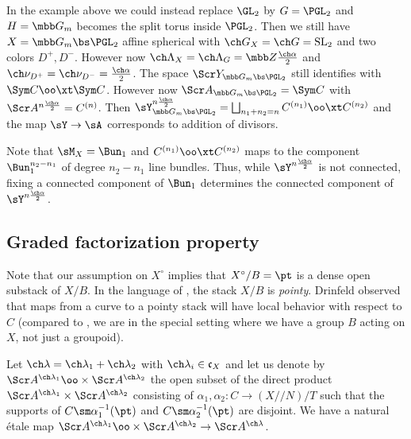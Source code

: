 \begin{eg}
\notready \label{eg:YHeckePGL}
In the example above we could instead replace $\GL_2$ by $G = \PGL_2$ and
$H = \mbb G_m$ becomes the split torus inside $\PGL_2$.
Then we still have $X = \mbb G_m\bs \PGL_2$ affine spherical with $\ch G_X = \ch G = \mathrm{SL}_2$ and two colors $D^+,D^-$.
However now $\ch\Lambda_X = \ch\Lambda_G = \mbb Z \frac {\ch\alpha}2$
and $\ch\nu_{D^+} = \ch\nu_{D^-} = \frac {\ch\alpha}2$.
The space $\Scr Y_{\mbb G_m \bs \PGL_2}$ still identifies with
$\Sym C \oo\xt \Sym C$. However now $\Scr A_{\mbb G_m \bs \PGL_2} = \Sym C$
with $\Scr A^{n \frac{\ch\alpha}2} = C^{(n)}$.
Then $\sY_{\mbb G_m \bs \PGL_2}^{n \frac{\ch\alpha}2} = \bigsqcup_{n_1+n_2=n} C^{(n_1)}\oo\xt C^{(n_2)}$ and the map $\sY \to \sA$ corresponds to addition of divisors.

Note that $\sM_X = \Bun_1$ and $C^{(n_1)}\oo\xt C^{(n_2)}$ maps to the component
$\Bun_1^{n_2-n_1}$ of degree $n_2-n_1$ line bundles.
Thus, while $\sY^{n \frac{\ch\alpha}2}$ is not connected,
fixing a connected component of $\Bun_1$ determines the connected
component of $\sY^{n \frac{\ch\alpha}2}$.
\end{eg}


\subsection{Graded factorization property}
Note that our assumption on $X^\circ$ implies that $X^\circ/B=\pt$ is a dense open
substack of $X/B$. In the language of \cite[\S 4.2.1]{Drinfeld}, the stack $X/B$ is \emph{pointy}. Drinfeld observed that maps from a curve to a pointy stack will have local
behavior with respect to $C$ (compared to \cite{Drinfeld}, we are in the special
setting where we have a group $B$ acting on $X$, not just a groupoid).


Let $\ch\lambda = \ch\lambda_1 + \ch\lambda_2$ with $\ch\lambda_i \in \mathfrak c_X$ and let us denote by $\Scr A^{\ch\lambda_1} \oo\times \Scr A^{\ch\lambda_2}$ the open subset of the direct product $\Scr A^{\ch\lambda_1} \times \Scr A^{\ch\lambda_2}$ consisting of $\alpha_1,\alpha_2 : C \to (X/\!\!/N)/T$ such that
the supports of $C\sm \alpha_1^{-1}(\pt)$ and $C\sm \alpha_2^{-1}(\pt)$ are
disjoint.
We have a natural \'etale map $\Scr A^{\ch\lambda_1} \oo\times \Scr A^{\ch\lambda_2} \to \Scr A^{\ch\lambda}$.

